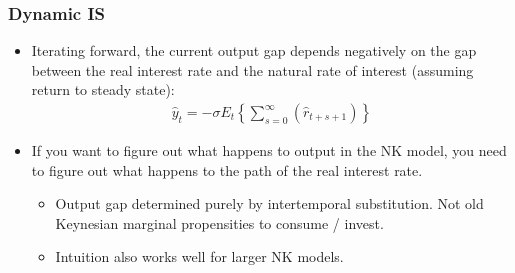 \documentclass[11pt,aspectratio=169,xcolor={dvipsnames},hyperref={pdftex,pdfpagemode=UseNone,hidelinks,pdfdisplaydoctitle=true},usepdftitle=false]{beamer}
\begin{document}
%
%
\begin{frame}
\frametitle{Dynamic IS
}
\begin{itemize}
	\item Iterating forward, the current output gap depends negatively on the gap between the real interest rate and the natural rate of interest (assuming return to steady state):
	\begin{align*}
		\hat{y}_t=-\sigma E_t\left\{\sum_{s=0}^{\infty}\left(\hat{r}_{t+s+1}\right)\right\}
	\end{align*}
	\item If you want to figure out what happens to output in the NK model, you need to figure out what happens to the path of the real interest rate.
	\begin{itemize}
		\item Output gap determined purely by intertemporal substitution. Not old Keynesian marginal propensities to consume / invest.
		\item Intuition also works well for larger NK models.
	\end{itemize}
\end{itemize}
\end{frame}
\end{document}
